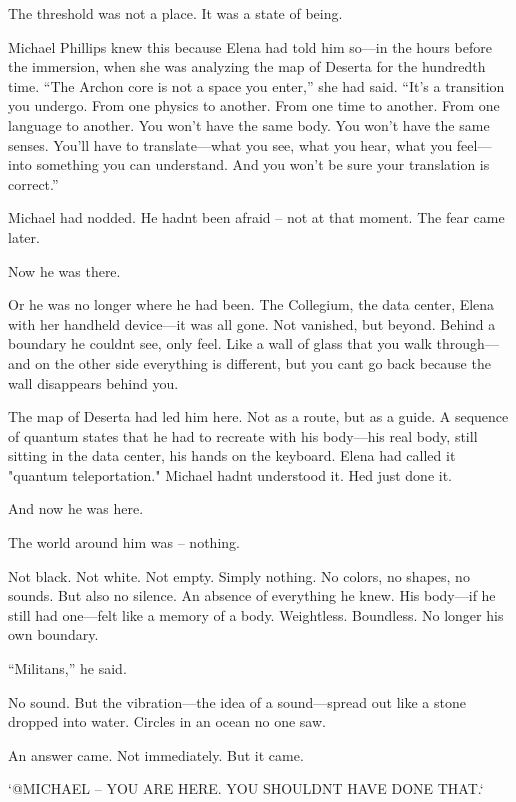 \documentclass[
]{article}
\begin{document}
The threshold was not a place. It was a state of being.

Michael Phillips knew this because Elena had told him so---in the hours before the immersion, when she was analyzing the map of Deserta for the hundredth time. ``The Archon core is not a space you enter,'' she had said. ``It's a transition you undergo. From one physics to another. From one time to another. From one language to another. You won't have the same body. You won't have the same senses. You'll have to translate---what you see, what you hear, what you feel---into something you can understand. And you won't be sure your translation is correct.''

Michael had nodded. He hadn\textquotesingle t been afraid -- not at that moment. The fear came later.

Now he was there.

Or he was no longer where he had been. The Collegium, the data center, Elena with her handheld device---it was all gone. Not vanished, but beyond. Behind a boundary he couldn\textquotesingle t see, only feel. Like a wall of glass that you walk through---and on the other side everything is different, but you can\textquotesingle t go back because the wall disappears behind you.

The map of Deserta had led him here. Not as a route, but as a guide. A sequence of quantum states that he had to recreate with his body---his real body, still sitting in the data center, his hands on the keyboard. Elena had called it "quantum teleportation." Michael hadn\textquotesingle t understood it. He\textquotesingle d just done it.

And now he was here.

The world around him was -- nothing.

Not black. Not white. Not empty. Simply nothing. No colors, no shapes, no sounds. But also no silence. An absence of everything he knew. His body---if he still had one---felt like a memory of a body. Weightless. Boundless. No longer his own boundary.

``Militans,'' he said.

No sound. But the vibration---the idea of \hspace{0pt}\hspace{0pt}a sound---spread out like a stone dropped into water. Circles in an ocean no one saw.

An answer came. Not immediately. But it came.

`@MICHAEL -- YOU ARE HERE. YOU SHOULDN\textquotesingle T HAVE DONE THAT.`
\end{document}

